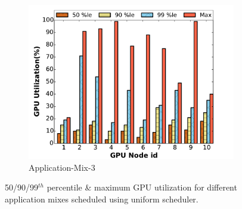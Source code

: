 \begin{figure}[!tbp]
\begin{subfigure}[b]{.33\textwidth}
  \includegraphics[width=1.1\linewidth]{results/app3-low.pdf}
  \caption{Application-Mix-3}
  \label{fig:app3}
\end{subfigure}
\vspace{-7mm}
\caption{50/90/99$^{th}$ percentile \& maximum GPU utilization for different application mixes scheduled using uniform scheduler.}
\label{fig:uniform}
\end{figure}

